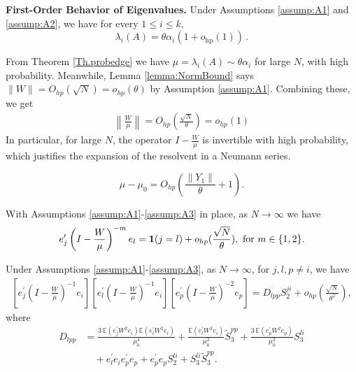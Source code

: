 \documentclass[10pt,a4paper]{amsart}
\newcommand{\one}{{\bf 1}}
\begin{document}
\begin{theorem}\label{Th.probedge}\textbf{First-Order Behavior of Eigenvalues.} Under Assumptions \eqref{assump:A1} and \eqref{assump:A2}, we have for every $1 \leq i \leq k$,
\[
\lambda_i(A) = \theta \alpha_i \left(1 + o_{\mathrm{hp}}(1)\right)\,.
\]
\end{theorem}

\begin{remark}\label{Bound.W/mu}
 From Theorem \ref{Th.probedge} we have $\mu = \lambda_i(A) \sim \theta \alpha_i$ for large $N$, with high probability. Meanwhile, Lemma \ref{lemma:NormBound} says $\|W\| = O_{hp}(\sqrt{N}) = o_{hp}(\theta)$ by Assumption \ref{assump:A1}. Combining these, we get
\begin{align*}
\left\|\frac{W}{\mu}\right\|=O_{hp}\left(\frac{\sqrt{N}}{\theta}\right) = o_{hp}(1)
\end{align*}
In particular, for large $N$, the operator $I - \frac{W}{\mu}$ is invertible with high probability, which justifies the expansion of the resolvent in a Neumann series.
\end{remark}

\begin{equation}\label{eq:mu-mu0}
    \mu-\mu_0=O_{hp}\left(\frac{\|Y_1\|}{\theta}+1\right).
    \end{equation}

\begin{lemma}\label{EigenVector.1}
With Assumptions \ref{assump:A1}-\ref{assump:A3} in place, as $N \to \infty$ we have %
\[
e_j^\prime\left(I - \frac{W}{\mu}\right)^{-m}e_l = \one(j =l) + o_{hp}(\frac{\sqrt{N}}{\theta}), \text{ for } m\in \{1,2\}.
\]
\end{lemma}

\begin{lemma}\label{EigenVector.3}
Under Assumptions \ref{assump:A1}-\ref{assump:A3}, as $N \to \infty$, for $j,l,p \ne i$, we have
\begin{align*}
\left[e_j^\prime\left(I - \frac{W}{\mu}\right)^{-1}e_i\right]
\left[e_l^\prime\left(I - \frac{W}{\mu}\right)^{-1}e_i\right]
\left[e_p^\prime\left(I - \frac{W}{\mu}\right)^{-2}e_p\right] 
= D_{lpp}S_2^{ji} + o_{hp}\left( \frac{\sqrt{N}}{\theta^2}\right),
\end{align*}
where
\begin{align*}
D_{lpp} &= \frac{3\,\mathbb E(e_j^\prime W^2 e_i) \mathbb E(e_l^\prime W^2 e_i)}{\mu_0^4}
+ \frac{\mathbb E(e_l^\prime W^2 e_i)}{\mu_0^2}\tilde S_3^{pp}
+ \frac{3\,\mathbb E(e_p^\prime W^2 e_p)}{\mu_0^2}S_3^{li} \\
&\quad + e_l^\prime e_i e_p^\prime e_p + e_p^\prime e_p S_2^{li} + S_3^{li}\tilde S_3^{pp}.
\end{align*}
\end{lemma}
\end{document}
